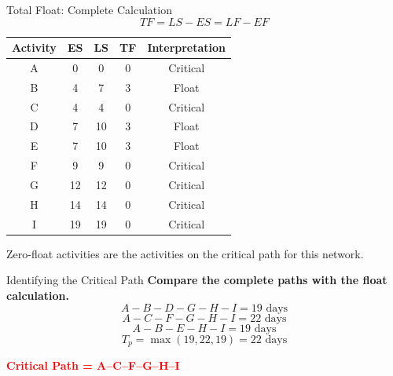 \documentclass[aspectratio=169,10pt]{beamer}
\newcommand{\criticaltext}[1]{\begin{center}\parbox{0.78\textwidth}{\centering\textcolor{Red}{\textbf{#1}}}\end{center}}
\begin{document}
\begin{frame}{Total Float: Complete Calculation}
\small
\[
\boxed{TF=LS-ES=LF-EF}
\]
\begin{center}
\begin{tabular}{c|c|c|c|c}
\toprule Activity & ES & LS & TF & Interpretation\\\midrule
A&0&0&0&Critical\\B&4&7&3&Float\\C&4&4&0&Critical\\D&7&10&3&Float\\E&7&10&3&Float\\F&9&9&0&Critical\\G&12&12&0&Critical\\H&14&14&0&Critical\\I&19&19&0&Critical\\\bottomrule
\end{tabular}
\end{center}
\pause
\begin{center}\parbox{0.82\textwidth}{\centering Zero-float activities are the activities on the critical path for this network.}\end{center}
\end{frame}

\begin{frame}{Identifying the Critical Path}
\small
\textbf{Compare the complete paths with the float calculation.}
\pause
\[A-B-D-G-H-I=19\text{ days}\]
\pause
\[A-C-F-G-H-I=22\text{ days}\]
\pause
\[A-B-E-H-I=19\text{ days}\]
\pause
\[T_p=\max(19,22,19)=\boxed{22\text{ days}}\]
\pause
\criticaltext{Critical Path = A--C--F--G--H--I}
\end{frame}
\end{document}
